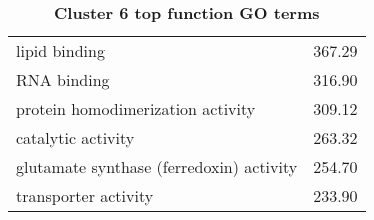\begin{table}[h]
\begin{center}
\begin{tabular}{p{}r}
lipid binding                                                 & 367.29                      \\
RNA binding                                                   & 316.90                      \\
protein homodimerization activity                             & 309.12                      \\ %
catalytic activity                                            & 263.32                      \\
glutamate synthase (ferredoxin) activity                      & 254.70                      \\ %
transporter activity                                          & 233.90                      \\ \bottomrule
\end{tabular}
\end{center}

\caption[Cluster 6 top function GO terms]{\sf \textbf{Cluster 6 top function GO terms}}
\label{tab:cls6-function}
\end{table}